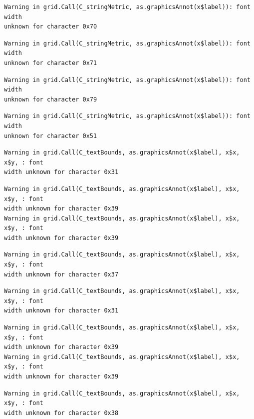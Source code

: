 \documentclass[
  letterpaper,
]{scrbook}
\begin{document}
\begin{verbatim}
Warning in grid.Call(C_stringMetric, as.graphicsAnnot(x$label)): font width
unknown for character 0x70
\end{verbatim}

\begin{verbatim}
Warning in grid.Call(C_stringMetric, as.graphicsAnnot(x$label)): font width
unknown for character 0x71
\end{verbatim}

\begin{verbatim}
Warning in grid.Call(C_stringMetric, as.graphicsAnnot(x$label)): font width
unknown for character 0x79
\end{verbatim}

\begin{verbatim}
Warning in grid.Call(C_stringMetric, as.graphicsAnnot(x$label)): font width
unknown for character 0x51
\end{verbatim}

\begin{verbatim}
Warning in grid.Call(C_textBounds, as.graphicsAnnot(x$label), x$x, x$y, : font
width unknown for character 0x31
\end{verbatim}

\begin{verbatim}
Warning in grid.Call(C_textBounds, as.graphicsAnnot(x$label), x$x, x$y, : font
width unknown for character 0x39
Warning in grid.Call(C_textBounds, as.graphicsAnnot(x$label), x$x, x$y, : font
width unknown for character 0x39
\end{verbatim}

\begin{verbatim}
Warning in grid.Call(C_textBounds, as.graphicsAnnot(x$label), x$x, x$y, : font
width unknown for character 0x37
\end{verbatim}

\begin{verbatim}
Warning in grid.Call(C_textBounds, as.graphicsAnnot(x$label), x$x, x$y, : font
width unknown for character 0x31
\end{verbatim}

\begin{verbatim}
Warning in grid.Call(C_textBounds, as.graphicsAnnot(x$label), x$x, x$y, : font
width unknown for character 0x39
Warning in grid.Call(C_textBounds, as.graphicsAnnot(x$label), x$x, x$y, : font
width unknown for character 0x39
\end{verbatim}

\begin{verbatim}
Warning in grid.Call(C_textBounds, as.graphicsAnnot(x$label), x$x, x$y, : font
width unknown for character 0x38
\end{verbatim}
\end{document}
